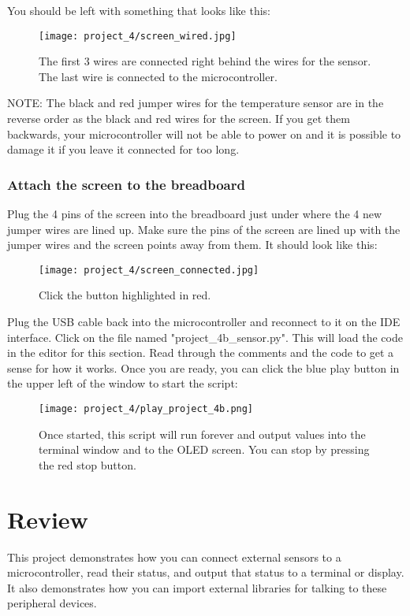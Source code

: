 You should be left with something that looks like this:
\begin{figure}[H]
    \centering
    \texttt{[image: project\_4/screen\_wired.jpg]}
    \caption{The first 3 wires are connected right behind the wires for the sensor. The last wire is connected to the microcontroller.}
\end{figure}

\begin{tcolorbox}[colback=yellow!10!white,colframe=yellow!50!black]
    NOTE: The black and red jumper wires for the temperature sensor are in the reverse order as the
    black and red wires for the screen. If you get them backwards, your microcontroller will not be able
    to power on and it is possible to damage it if you leave it connected for too long.
\end{tcolorbox}

\subsubsection{Attach the screen to the breadboard}
Plug the 4 pins of the screen into the breadboard just under where the 4 new jumper wires are lined up. Make sure the pins of
the screen are lined up with the jumper wires and the screen points away from them. It should look like this:

\begin{figure}[H]
    \centering
    \texttt{[image: project\_4/screen\_connected.jpg]}
    \caption{Click the button highlighted in red.}
\end{figure}

Plug the USB cable back into the microcontroller and reconnect to it on the IDE interface.
Click on the file named "project\_4b\_sensor.py". This will load the code in the editor for this section. Read through the comments and
the code to get a sense for how it works. Once you are ready, you can click the blue play button in the upper left of the window to start the script:

\begin{figure}[H]
    \centering
    \texttt{[image: project\_4/play\_project\_4b.png]}
    \caption{Once started, this script will run forever and output values into the terminal window and to the OLED screen.
    You can stop by pressing the red stop button.}
\end{figure}

\section{Review}
This project demonstrates how you can connect external sensors to a microcontroller, read their status,
and output that status to a terminal or display. It also demonstrates how you can import external libraries
for talking to these peripheral devices.


